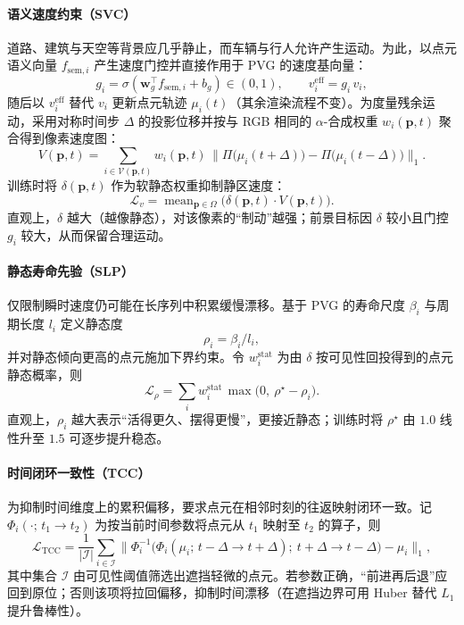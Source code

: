 \documentclass[10pt,conference]{IEEEtran} %
\begin{document}
\paragraph{语义速度约束（SVC）}
道路、建筑与天空等背景应几乎静止，而车辆与行人允许产生运动。为此，以点元语义向量 $f_{\mathrm{sem},i}$ 产生速度门控并直接作用于 PVG 的速度基向量：
\begin{equation}
g_i=\sigma(\mathbf w_g^\top f_{\mathrm{sem},i}+b_g)\in(0,1),\qquad
v_i^{\mathrm{eff}}=g_i\,v_i,
\label{eq:svc_gate}
\end{equation}
随后以 $v_i^{\mathrm{eff}}$ 替代 $v_i$ 更新点元轨迹 $\mu_i(t)$（其余渲染流程不变）。为度量残余运动，采用对称时间步 $\Delta$ 的投影位移并按与 RGB 相同的 $\alpha$-合成权重 $w_i(\mathbf p,t)$ 聚合得到像素速度图：
\begin{equation}
V(\mathbf p,t)=\sum_{i\in\mathcal V(\mathbf p,t)} w_i(\mathbf p,t)\,
\big\|\Pi\!\big(\mu_i(t+\Delta)\big)-\Pi\!\big(\mu_i(t-\Delta)\big)\big\|_1 .
\label{eq:vel_map}
\end{equation}
训练时将 $\delta(\mathbf p,t)$ 作为软静态权重抑制静区速度：
\begin{equation}
\mathcal L_{v}=\operatorname{mean}_{\mathbf p\in\Omega}\!\big(\delta(\mathbf p,t)\cdot V(\mathbf p,t)\big).
\label{eq:svc_loss}
\end{equation}
直观上，$\delta$ 越大（越像静态），对该像素的“制动”越强；前景目标因 $\delta$ 较小且门控 $g_i$ 较大，从而保留合理运动。

\paragraph{静态寿命先验（SLP）}
仅限制瞬时速度仍可能在长序列中积累缓慢漂移。基于 PVG 的寿命尺度 $\beta_i$ 与周期长度 $l_i$ 定义静态度
\begin{equation}
\rho_i=\beta_i/l_i,
\label{eq:rho_def_again}
\end{equation}
并对静态倾向更高的点元施加下界约束。令 $w_i^{\mathrm{stat}}$ 为由 $\delta$ 按可见性回投得到的点元静态概率，则
\begin{equation}
\mathcal L_{\rho}=\sum_{i} w_i^{\mathrm{stat}}\,
\max\!\big(0,\ \rho^\star-\rho_i\big).
\label{eq:slp_loss}
\end{equation}
直观上，$\rho_i$ 越大表示“活得更久、摆得更慢”，更接近静态；训练时将 $\rho^\star$ 由 $1.0$ 线性升至 $1.5$ 可逐步提升稳态。

\paragraph{时间闭环一致性（TCC）}
为抑制时间维度上的累积偏移，要求点元在相邻时刻的往返映射闭环一致。记 $\Phi_i(\cdot;\,t_1\!\to\!t_2)$ 为按当前时间参数将点元从 $t_1$ 映射至 $t_2$ 的算子，则
\begin{equation}
\mathcal L_{\mathrm{TCC}}
=\frac{1}{|\mathcal I|}\sum_{i\in\mathcal I}
\Big\|
\Phi_i^{-1}\!\big(\Phi_i(\mu_i;\,t-\Delta\!\to\!t+\Delta);\ t+\Delta\!\to\!t-\Delta\big)-\mu_i
\Big\|_1,
\label{eq:tcc}
\end{equation}
其中集合 $\mathcal I$ 由可见性阈值筛选出遮挡轻微的点元。若参数正确，“前进再后退”应回到原位；否则该项将拉回偏移，抑制时间漂移（在遮挡边界可用 Huber 替代 $L_1$ 提升鲁棒性）。
\end{document}
